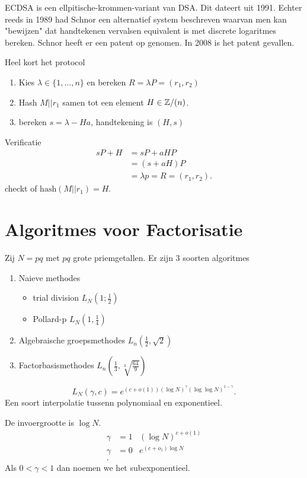 ECDSA is een ellpitische-krommen-variant van DSA. Dit dateert uit 1991. 
Echter reeds in 1989 had Schnor een alternatief system beschreven waarvan men kan "bewijzen" dat handtekenen vervalsen equivalent is met discrete logaritmes bereken.
Schnor heeft er een patent op genomen. In 2008 is het patent gevallen. 

Heel kort het protocol
\begin{enumerate}
	\item Kies $\lambda \in  \{1, \ldots, n\} $ en bereken $R = \lambda P = (r_1, r_2)$ 
	\item Hash $M  | | r_1$ samen tot een element  $H \in \mathbb{Z} / (n)$. 
	\item bereken $s = \lambda - Ha$, handtekening is $(H, s)$
\end{enumerate}
Verificatie 
\begin{align*}
	s P + H &=  sP + aHP \\
		&= (s + aH) P \\
		&= \lambda p = R = (r_1, r_2)
.\end{align*}
checkt of $\text{hash}(M | | r_1) = H$. 

\section{Algoritmes voor Factorisatie} \label{sec:algoritmes_voor_factorisatie}

Zij $N = pq$ met $pq$ grote priemgetallen. 
Er zijn 3 soorten algoritmes
\begin{enumerate}
	\item Naieve methodes
		\begin{itemize}
			\item trial division \hfill $L_N(1;\frac{1}{2})$
			\item Pollard-p \hfill $L_N(1, \frac{1}{4})$
		\end{itemize}
	\item Algebraische groepsmethodes \hfill $L_n(\frac{1}{2}, \sqrt{2}) $
	\item Factorbasismethodes \hfill $L_n(\frac{1}{3}, \sqrt[3]{\frac{64}{9}}) $
\end{enumerate}
 
 \begin{definitie}
	 [L-notatie]
	 \[
		 L_N(\gamma, c) = e^{(c +  o(1)) (\log N)^{\gamma}(\log \log N)^{1- \gamma}}
	 .\] 
	 Een soort interpolatie tussenn polynomiaal en exponentieel.
\end{definitie}
\begin{opmerking}
	De invoergrootte is $\log N$. 
	\begin{align*}
		\gamma &=  1 &(\log N)^{c + o(1)} \tag{polynomiaal}\\
		\gamma &= 0 &e^{(c + o_{1}) \log N} \tag{exponentieel}\\	
	.\end{align*}
	Als $0< \gamma< 1$ dan noemen we het subexponentieel.
\end{opmerking}

